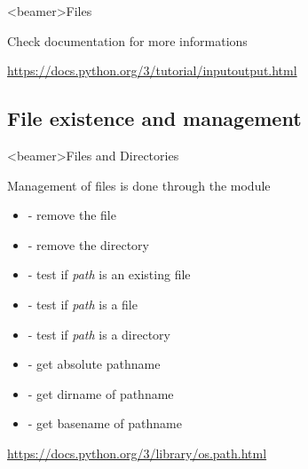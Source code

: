 \begin{frame}<beamer>{Files}

  \begin{center}
     Check documentation for more informations

    \bigskip

     \url{https://docs.python.org/3/tutorial/inputoutput.html}
  \end{center}

\end{frame}


\subsection{File existence and management}

\begin{frame}<beamer>{Files and Directories}

  Management of files is done through the  module

  \begin{itemize}
    \item<2->  - remove the file
    \item<3->  - remove the directory
    \item<4->  - test if \textit{path} is an existing file
    \item<5->  - test if \textit{path} is a file
    \item<6->  - test if \textit{path} is a directory
    \item<7->  - get absolute pathname
    \item<8->  - get dirname of pathname
    \item<9->  - get basename of pathname
  \end{itemize}

  \begin{center}
     \url{https://docs.python.org/3/library/os.path.html}
  \end{center}

\end{frame}

